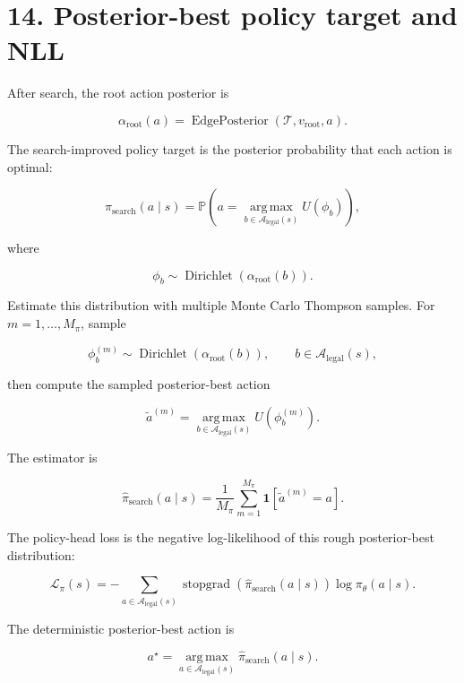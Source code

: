 \documentclass[11pt]{article}
\newcommand{\Prob}{\mathbb{P}}
\newcommand{\one}{\mathbf{1}}
\newcommand{\Dir}{\operatorname{Dirichlet}}
\newcommand{\argmax}{\operatorname*{arg\,max}}
\newcommand{\stopgrad}{\operatorname{stopgrad}}
\newcommand{\Tree}{\mathcal{T}}
\newcommand{\Legal}{\mathcal{A}_{\mathrm{legal}}}
\newcommand{\Utility}{U}
\newcommand{\EdgePosterior}{\operatorname{EdgePosterior}}
\begin{document}
\section*{14. Posterior-best policy target and NLL}

After search, the root action posterior is

\[
\alpha_{\mathrm{root}}(a)
=
\EdgePosterior(\Tree,v_{\mathrm{root}},a).
\]

The search-improved policy target is the posterior probability that each action
is optimal:

\[
\pi_{\mathrm{search}}(a\mid s)
=
\Prob
\left(
  a
  =
  \argmax_{b\in\Legal(s)}
  \Utility(\phi_b)
\right),
\]

where

\[
\phi_b
\sim
\Dir(\alpha_{\mathrm{root}}(b)).
\]

Estimate this distribution with multiple Monte Carlo Thompson samples. For
\(m=1,\ldots,M_\pi\), sample

\[
\phi_b^{(m)}
\sim
\Dir(\alpha_{\mathrm{root}}(b)),
\qquad
b\in\Legal(s),
\]

then compute the sampled posterior-best action

\[
\tilde a^{(m)}
=
\argmax_{b\in\Legal(s)}
\Utility(\phi_b^{(m)}).
\]

The estimator is

\[
\hat{\pi}_{\mathrm{search}}(a\mid s)
=
\frac{1}{M_\pi}
\sum_{m=1}^{M_\pi}
\one[\tilde a^{(m)}=a].
\]

The policy-head loss is the negative log-likelihood of this rough posterior-best
distribution:

\[
\mathcal{L}_\pi(s)
=
-
\sum_{a\in\Legal(s)}
\stopgrad\left(\hat\pi_{\mathrm{search}}(a\mid s)\right)
\log \pi_\theta(a\mid s).
\]

The deterministic posterior-best action is

\[
a^\star
=
\argmax_{a\in\Legal(s)}
\hat\pi_{\mathrm{search}}(a\mid s).
\]
\end{document}
